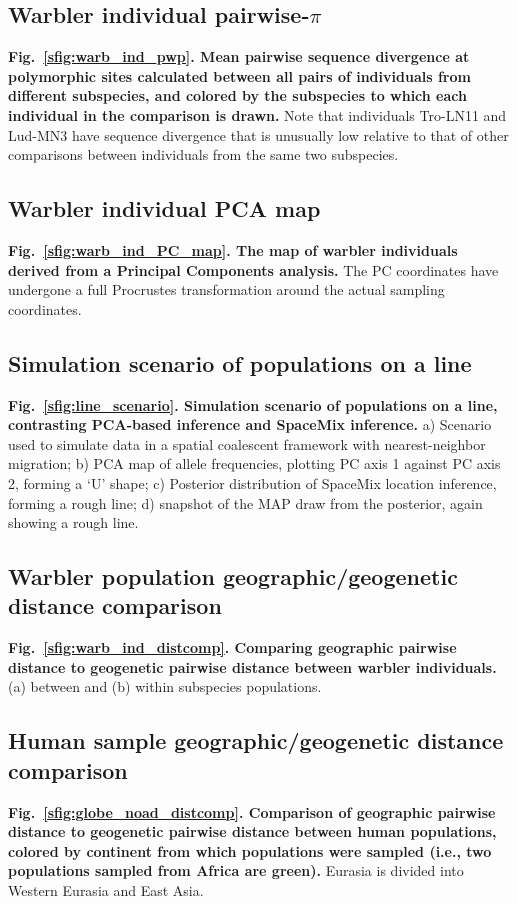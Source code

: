 \documentclass[10pt,letterpaper]{article}
\begin{document}
\subsection*{Warbler individual pairwise-$\pi$}
\label{warb_ind_pwp}
{\bf{Fig.\ \ref{sfig:warb_ind_pwp}. Mean pairwise sequence divergence at polymorphic sites calculated between all pairs of individuals from different subspecies, and colored by the subspecies to which each individual in the comparison is drawn.}} Note that individuals Tro-LN11 and Lud-MN3 have sequence divergence that is unusually low relative to that of other comparisons between individuals from the same two subspecies.

\subsection*{Warbler individual PCA map}
\label{warb_ind_PC_map}
{\bf{Fig.\ \ref{sfig:warb_ind_PC_map}. The map of warbler individuals derived from a Principal Components analysis.}} The PC coordinates have undergone a full Procrustes transformation around the actual sampling coordinates.

\subsection*{Simulation scenario of populations on a line}
\label{line_scenario}
{\bf{Fig.\ \ref{sfig:line_scenario}. Simulation scenario of populations on a line, contrasting PCA-based inference and SpaceMix inference.}} a) Scenario used to simulate data in a spatial coalescent framework with nearest-neighbor migration; b) PCA map of allele frequencies, plotting PC axis 1 against PC axis 2, forming a `U' shape; c) Posterior distribution of SpaceMix location inference, forming a rough line; d) snapshot of the MAP draw from the posterior, again showing a rough line.

\subsection*{Warbler population geographic/geogenetic distance comparison}
\label{warb_ind_distcomp}
{\bf{Fig.\ \ref{sfig:warb_ind_distcomp}. Comparing geographic pairwise distance to geogenetic pairwise distance between warbler individuals.}} 
(a) between and (b) within subspecies populations.

\subsection*{Human sample geographic/geogenetic distance comparison}
\label{globe_noad_distcomp}
{\bf{Fig.\ \ref{sfig:globe_noad_distcomp}. Comparison of geographic pairwise distance to geogenetic pairwise distance between human populations, colored by continent from which populations were sampled (i.e., two populations sampled from Africa are green).}} Eurasia is divided into Western Eurasia and East Asia.
\end{document}

